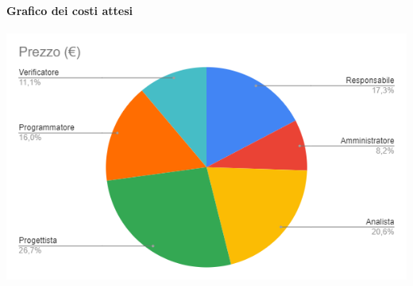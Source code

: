 \documentclass[a4paper, 12pt]{article}
\begin{document}
\paragraph{Grafico dei costi attesi}
\graphicspath{ {./immagini/} }
\includegraphics{grafico_costi.png}
\end{document}
